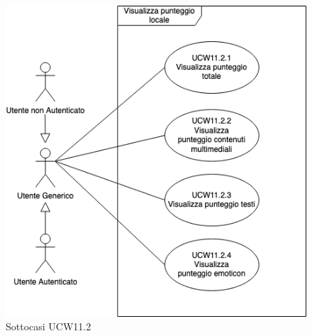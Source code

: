 \begin{figure}[!h]
	\centering
	\includegraphics[scale=0.5]{UC_images/UCW11-2.png} 
	\caption{Sottocasi UCW11.2}
\end{figure}

